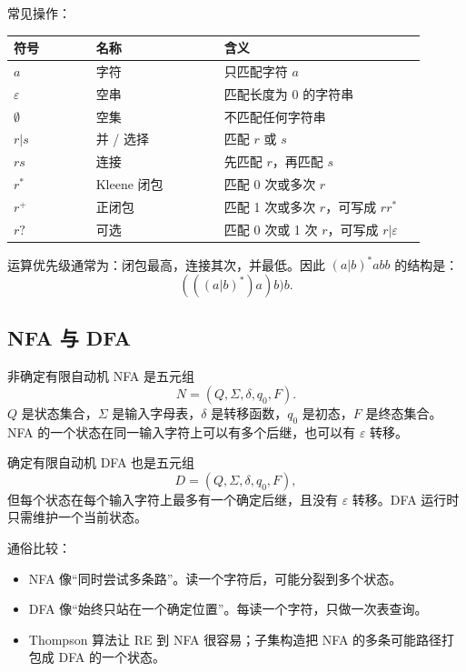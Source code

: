 \documentclass[UTF8,fontset=none,11pt]{ctexart}
\newenvironment{defbox}[1][]{%
  \par\medskip\noindent{\color{defrule}\rule{\linewidth}{1.1pt}}\par\nopagebreak
  \noindent{\bfseries\color{defrule}#1}\par\nopagebreak\smallskip}%
  {\par\nopagebreak\smallskip\noindent{\color{defrule}\rule{\linewidth}{0.4pt}}\par\medskip}
\newcommand{\eps}{\varepsilon}
\begin{document}
常见操作：

\begin{longtable}{L{0.18\linewidth}L{0.28\linewidth}L{0.44\linewidth}}
\toprule
符号 & 名称 & 含义 \\
\midrule
\(a\) & 字符 & 只匹配字符 \(a\) \\
\(\eps\) & 空串 & 匹配长度为 0 的字符串 \\
\(\emptyset\) & 空集 & 不匹配任何字符串 \\
\(r|s\) & 并 / 选择 & 匹配 \(r\) 或 \(s\) \\
\(rs\) & 连接 & 先匹配 \(r\)，再匹配 \(s\) \\
\(r^*\) & Kleene 闭包 & 匹配 0 次或多次 \(r\) \\
\(r^+\) & 正闭包 & 匹配 1 次或多次 \(r\)，可写成 \(rr^*\) \\
\(r?\) & 可选 & 匹配 0 次或 1 次 \(r\)，可写成 \(r|\eps\) \\
\bottomrule
\end{longtable}

运算优先级通常为：闭包最高，连接其次，并最低。因此 \((a|b)^*abb\) 的结构是：
\[
(((a|b)^*)a)b)b.
\]

\subsection{NFA 与 DFA}

\begin{defbox}[NFA]
非确定有限自动机 NFA 是五元组
\[
N=(Q,\Sigma,\delta,q_0,F).
\]
\(Q\) 是状态集合，\(\Sigma\) 是输入字母表，\(\delta\) 是转移函数，\(q_0\) 是初态，\(F\) 是终态集合。NFA 的一个状态在同一输入字符上可以有多个后继，也可以有 \(\eps\) 转移。
\end{defbox}

\begin{defbox}[DFA]
确定有限自动机 DFA 也是五元组
\[
D=(Q,\Sigma,\delta,q_0,F),
\]
但每个状态在每个输入字符上最多有一个确定后继，且没有 \(\eps\) 转移。DFA 运行时只需维护一个当前状态。
\end{defbox}

通俗比较：

\begin{itemize}
  \item NFA 像“同时尝试多条路”。读一个字符后，可能分裂到多个状态。
  \item DFA 像“始终只站在一个确定位置”。每读一个字符，只做一次表查询。
  \item Thompson 算法让 RE 到 NFA 很容易；子集构造把 NFA 的多条可能路径打包成 DFA 的一个状态。
\end{itemize}
\end{document}
